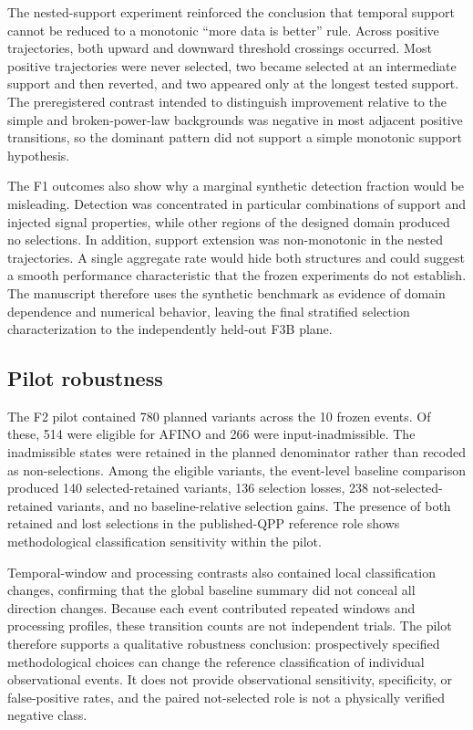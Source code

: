 \documentclass[11pt,a4paper]{article}
\begin{document}
The nested-support experiment reinforced the conclusion that temporal support cannot be reduced to a monotonic ``more data is better'' rule. Across positive trajectories, both upward and downward threshold crossings occurred. Most positive trajectories were never selected, two became selected at an intermediate support and then reverted, and two appeared only at the longest tested support. The preregistered contrast intended to distinguish improvement relative to the simple and broken-power-law backgrounds was negative in most adjacent positive transitions, so the dominant pattern did not support a simple monotonic support hypothesis.

The F1 outcomes also show why a marginal synthetic detection fraction would be misleading. Detection was concentrated in particular combinations of support and injected signal properties, while other regions of the designed domain produced no selections. In addition, support extension was non-monotonic in the nested trajectories. A single aggregate rate would hide both structures and could suggest a smooth performance characteristic that the frozen experiments do not establish. The manuscript therefore uses the synthetic benchmark as evidence of domain dependence and numerical behavior, leaving the final stratified selection characterization to the independently held-out F3B plane.

\subsection{Pilot robustness}
The F2 pilot contained 780 planned variants across the 10 frozen events. Of these, 514 were eligible for AFINO and 266 were input-inadmissible. The inadmissible states were retained in the planned denominator rather than recoded as non-selections. Among the eligible variants, the event-level baseline comparison produced 140 selected-retained variants, 136 selection losses, 238 not-selected-retained variants, and no baseline-relative selection gains. The presence of both retained and lost selections in the published-QPP reference role shows methodological classification sensitivity within the pilot.

Temporal-window and processing contrasts also contained local classification changes, confirming that the global baseline summary did not conceal all direction changes. Because each event contributed repeated windows and processing profiles, these transition counts are not independent trials. The pilot therefore supports a qualitative robustness conclusion: prospectively specified methodological choices can change the reference classification of individual observational events. It does not provide observational sensitivity, specificity, or false-positive rates, and the paired not-selected role is not a physically verified negative class.
\end{document}
